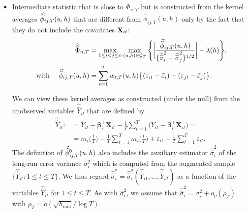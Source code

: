 \documentclass[a4paper,12pt]{article}
\newcommand{\doublehat}[1]{\skew{5.5}\widehat{\widehat{#1}}}
\newcommand{\doublehattwo}[1]{\widehat{\widehat{#1}}}
\begin{document}
\begin{itemize}
\item Intermediate statistic that is close to $\widehat{\Phi}_{n, T}$ but is constructed from the kernel averages $\doublehat{\phi}_{ij,T}(u,h)$ that are different from $\widehat{\phi}_{ij,T}(u,h)$ only by the fact that they do not include the covariates $\mathbf{X}_{it}$:
\begin{align*}
	\doublehattwo{\Phi}_{n,T} &= \max_{1 \le i < j \le n} \max_{(u,h) \in \mathcal{G}_T}\Bigg\{ \bigg| \frac{\doublehat{\phi}_{ij,T}(u,h)} {\{ \doublehattwo{\sigma}_i^2 + \doublehattwo{\sigma}_j^2 \}^{1/2}} \bigg| - \lambda(h)\Bigg\}, \\
   \text{ with  } \quad  	 \doublehat{\phi}_{ij,T}(u,h) &= \sum_{t=1}^T w_{t,T}(u,h) \big\{ (\varepsilon_{it} - \bar{\varepsilon}_i) - (\varepsilon_{jt} - \bar{\varepsilon}_j)  \big\}.\nonumber 
\end{align*}

We can view these kernel averages as constructed (under the null) from the unobserved variables $\doublehattwo{Y}_{it}$ that are defined by 
\begin{align*}
\doublehattwo{Y}_{it} :&= Y_{it} - \bm{\beta}_i^\top \mathbf{X}_{it} -  \frac{1}{T}\sum_{t=1}^T \big(Y_{it} - \bm{\beta}_i^\top \mathbf{X}_{it}\big) =\\
&=m_i \Big( \frac{t}{T} \Big)  - \frac{1}{T}\sum_{t=1}^T  m_i \Big( \frac{t}{T} \Big) + \varepsilon_{it} - \frac{1}{T}\sum_{t=1}^T \varepsilon_{it}.
\end{align*}
The definition of $\doublehat{\phi}^0_{ij,T}(u,h)$ also includes the auxiliary estimator $\doublehattwo{\sigma}_i^2$ of the long-run error variance $\sigma_i^2$ which is computed from the augmented sample \linebreak $\{ \doublehattwo{Y}_{it}: 1 \le t \le T \}$. We thus regard $\doublehattwo{\sigma}_i^2 = \doublehattwo{\sigma}_i^2(\doublehattwo{Y}_{i1},\ldots,\doublehattwo{Y}_{iT})$ as a function of the variables $\doublehattwo{Y}_{it}$ for $1 \le t \le T$. As with $\widehat{\sigma}_i^2$, we assume that $\doublehattwo{\sigma}_i^2 = \sigma^2_i + o_p(\rho_T)$ with $\rho_T = o(\sqrt{h_{\min}}/\log T)$.




\end{itemize}
\end{document}
